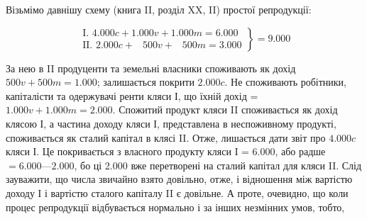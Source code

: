 Візьмімо давнішу схему (книга II, розділ XX, II) простої репродукції:

\begin{center}
\[
 \left.\begin{aligned}
        \text{I. }\num{4.000} c + \num{1.000} v + \num{1.000} m = \num{6.000}\\
        \text{II. }\num{2.000} c + \phantom{0.}500 v + \phantom{0.}500 m = \num{3.000}
       \end{aligned}
 \right\}
  = \num{9.000}
\]
\end{center}
За нею в II продуценти та земельні власники споживають як дохід
$500 v + 500 m = \num{1.000}$; залишається покрити $\num{2.000} c$. Не споживають
робітники, капіталісти та одержувачі ренти кляси І, що їхній дохід =
$\num{1.000} v + \num{1.000} m = \num{2.000}$. Спожитий продукт кляси II споживається як дохід
клясою І, а частина доходу кляси І, представлена в неспоживному продукті,
споживається як сталий капітал в клясі II. Отже, лишається дати звіт про
$\num{4.000} c$ кляси І. Це покривається з власного продукту кляси І = \num{6.000}, або радше
$= \num{6.000} — \num{2.000}$, бо ці \num{2.000} вже перетворені на сталий капітал для кляси II. Слід
зауважити, що числа звичайно взято довільно, отже, і відношення між вартістю
доходу І і вартістю сталого капіталу II є довільне. А проте, очевидно, що коли
процес репродукції відбувається нормально і за інших незмінних умов, тобто,
\parbreak{}  %
